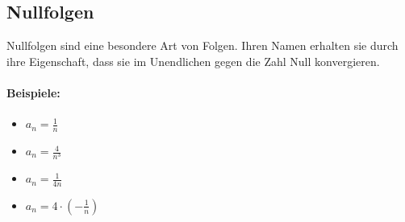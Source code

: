 \subsection{Nullfolgen}
Nullfolgen sind eine besondere Art von Folgen. Ihren Namen erhalten sie durch ihre Eigenschaft, dass sie im Unendlichen gegen die Zahl Null konvergieren.

\paragraph{Beispiele:}
\begin{itemize}
\item $ a_n = \frac{1}{n} $
\item $ a_n = \frac{4}{n^3} $
\item $ a_n = \frac{1}{4n}$
\item $ a_n = 4 \cdot \left(-\frac{1}{n}\right)$
\end{itemize}